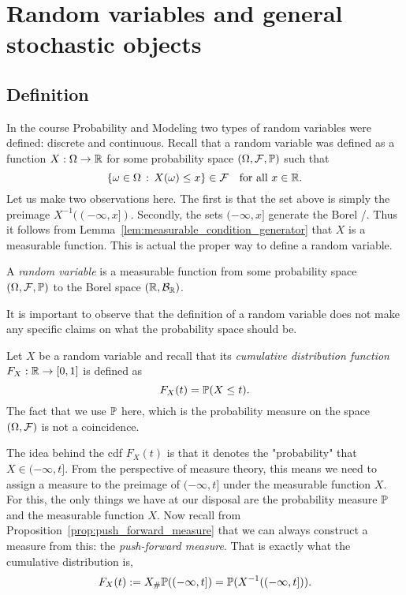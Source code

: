 
\section{Random variables and general stochastic objects}\label{sec:random_variables}



\subsection{Definition}

In the course Probability and Modeling two types of random variables were defined: discrete and continuous. Recall that a random variable was defined as a function $X : \Omega \to \mathbb R$ for some probability space $(\Omega, \mathcal F, \mathbb P)$ such that
\[
	\{\omega \in \Omega \, : \, X(\omega) \le x\} \in \mathcal F \quad \text{for all } x \in \mathbb R.
\]
Let us make two observations here. The first is that the set above is simply the preimage $X^{-1}((-\infty,x])$. Secondly, the sets $(-\infty, x]$ generate the Borel \sigalg/. Thus it follows from Lemma~\ref{lem:measurable_condition_generator} that $X$ is a measurable function. This is actual the proper way to define a random variable.

\begin{definition}
A \emph{random variable} is a measurable function from some probability space $(\Omega,\mathcal F, \mathbb P)$ to the Borel space $(\mathbb R, \mathcal B_{\mathbb R})$.
\end{definition}

It is important to observe that the definition of a random variable does not make any specific claims on what the probability space should be. 

Let $X$ be a random variable and recall that its \emph{cumulative distribution function} $F_X : \mathbb R \to [0,1]$ is defined as
\[
	F_X(t) = \mathbb P(X \le t).
\] 
The fact that we use $\mathbb P$ here, which is the probability measure on the space $(\Omega, \mathcal F)$ is not a coincidence.

The idea behind the cdf $F_X(t)$ is that it denotes the "probability" that $X \in (-\infty ,t]$. From the perspective of measure theory, this means we need to assign a measure to the preimage of $(-\infty, t]$ under the measurable function $X$. For this, the only things we have at our disposal are the probability measure $\mathbb P$ and the measurable function $X$. Now recall from Proposition~\ref{prop:push_forward_measure} that we can always construct a measure from this: the \emph{push-forward measure}. That is exactly what the cumulative distribution is,
\[
	F_X(t) := X_\# \mathbb P((-\infty, t]) = \mathbb P(X^{-1}((-\infty,t])).
\]

